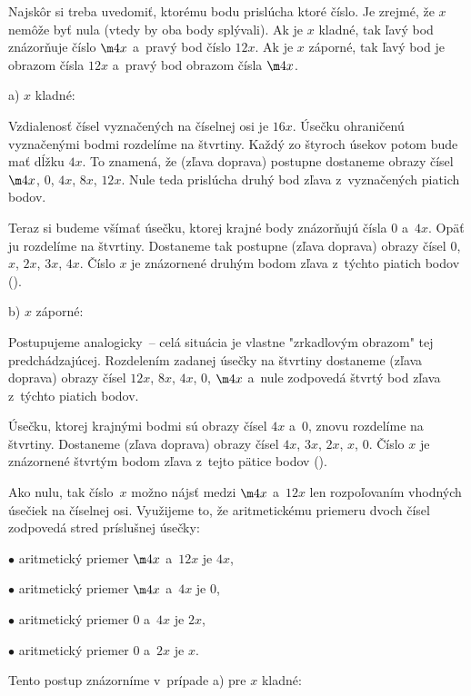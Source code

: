 {%
Najskôr si treba uvedomiť, ktorému bodu prislúcha ktoré číslo. Je zrejmé,
že $x$ nemôže byť nula (vtedy by oba body splývali). Ak je $x$ kladné,
tak ľavý bod znázorňuje číslo $\m4x$ a~pravý bod číslo $12x$. Ak je
$x$ záporné, tak ľavý bod je obrazom čísla $12x$ a~pravý bod obrazom čísla $\m4x$.

\smallskip
a) $x$ kladné:

Vzdialenosť čísel vyznačených na číselnej osi je $16x$. Úsečku ohraničenú
vyznačenými bodmi rozdelíme na štvrtiny. Každý zo štyroch úsekov potom bude mať dĺžku
$4x$. To znamená, že (zľava doprava) postupne dostaneme obrazy čísel
$\m4x$, $0$, $4x$, $8x$, $12x$. Nule teda prislúcha druhý bod zľava z~vyznačených piatich bodov.

Teraz si budeme všímať úsečku, ktorej krajné body znázorňujú čísla $0$ a~$4x$.
Opäť ju rozdelíme na štvrtiny. Dostaneme tak postupne (zľava doprava) obrazy čísel
$0$, $x$, $2x$, $3x$, $4x$.
Číslo $x$ je znázornené druhým bodom zľava z~týchto piatich bodov (\obr{}).
%

\smallskip
b) $x$ záporné:

Postupujeme analogicky~-- celá situácia je vlastne "zrkadlovým obrazom" tej predchádzajúcej.
Rozdelením zadanej úsečky na štvrtiny dostaneme (zľava doprava) obrazy čísel
$12x$, $8x$, $4x$, $0$, $\m4x$ a~nule zodpovedá štvrtý bod zľava z~týchto piatich bodov.

Úsečku, ktorej krajnými bodmi sú obrazy čísel $4x$ a~$0$, znovu rozdelíme na
štvrtiny. Dostaneme (zľava doprava) obrazy čísel $4x$, $3x$, $2x$, $x$,  $0$.
Číslo $x$ je znázornené štvrtým bodom zľava z~tejto pätice bodov (\obr{}).
%

\ineriesenie
Ako nulu, tak číslo~$x$ možno nájsť medzi $\m4x$ a~$12x$ len rozpoľovaním vhodných
úsečiek na číselnej osi.
Využijeme to, že aritmetickému priemeru dvoch čísel zodpovedá stred príslušnej
úsečky:
\item{$\bullet$} aritmetický priemer $\m4x$ a~$12x$ je $4x$,
\item{$\bullet$} aritmetický priemer $\m4x$ a~$4x$ je $0$,
\item{$\bullet$} aritmetický priemer $0$ a~$4x$ je $2x$,
\item{$\bullet$} aritmetický priemer $0$ a~$2x$ je $x$.

Tento postup znázorníme v~prípade a) pre $x$ kladné:
\obrplus{}%
}

